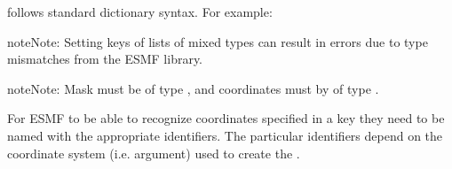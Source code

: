 \documentclass[letterpaper,10pt,english]{sphinxmanual}
\begin{document}
\begin{fulllineitems}
{\hyperref[\detokenize{locstream:ESMF.api.locstream.LocStream}]{}} follows standard dictionary syntax. For example:

\begin{sphinxVerbatim}[commandchars=\\\{\}]
\PYG{p}{[}\PYG{p}{]}  \PYG{p}{[}  \PYG{p}{]}
  \PYG{p}{[}\PYG{p}{]}
\PYG{p}{[}\PYG{p}{]}  \PYG{p}{[}  \PYG{p}{]}
  \PYG{p}{[}\PYG{p}{]}
\PYG{p}{[}\PYG{p}{]}  \PYG{p}{[}  \PYG{p}{]}
  \PYG{p}{[}\PYG{p}{]}
\end{sphinxVerbatim}

\begin{sphinxadmonition}{note}{Note:}
Setting keys of lists of mixed types can result in errors due to
type mismatches from the ESMF library.
\end{sphinxadmonition}

\begin{sphinxadmonition}{note}{Note:}
Mask must be of type {\hyperref[\detokenize{TypeKind:ESMF.api.constants.TypeKind.I4}]{}},
and coordinates must by of type {\hyperref[\detokenize{TypeKind:ESMF.api.constants.TypeKind.R8}]{}}.
\end{sphinxadmonition}

For ESMF to be able to recognize coordinates specified in a {\hyperref[\detokenize{locstream:ESMF.api.locstream.LocStream}]{}} key
they need to be named with the appropriate identifiers. The particular
identifiers depend on the coordinate system (i.e.  argument)
used to create the {\hyperref[\detokenize{locstream:ESMF.api.locstream.LocStream}]{}}.


\end{fulllineitems}
\end{document}

